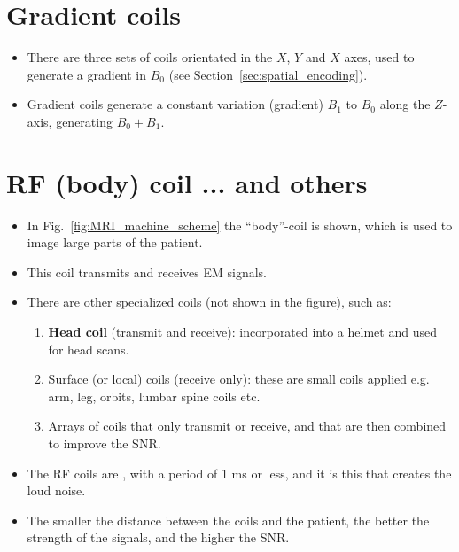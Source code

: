 \section{Gradient coils}
\begin{itemize}
\item There are three sets of coils orientated in the $X$, $Y$ and $X$
  axes, used to generate a gradient in $B_0$ (see
  Section~\ref{sec:spatial_encoding}).
\item Gradient coils generate a constant variation (gradient) $B_1$ to
  $B_0$ along the $Z$-axis, generating $B_0+B_1$.
\end{itemize}

\section{\gls{RF} (body) coil ... and others}
\begin{itemize}
\item In Fig.~\ref{fig:MRI_machine_scheme} the ``body''-coil is shown,
  which is used to image large parts of the patient.
\item This coil transmits and receives \gls{EM} signals.
\item There are other specialized coils (not shown in the figure),
  such as:
  \begin{enumerate}
  \item \textbf{Head coil} (transmit and receive): incorporated into a
    helmet and used for head scans.
  \item Surface (or local) coils (receive only): these are small coils
    applied  e.g. arm, leg, orbits, lumbar spine coils
    etc.
  \item Arrays of coils that only transmit or receive, and that are
    then combined to improve the SNR.
  \end{enumerate}
\item The RF coils are , with a period of 1 ms
  or less, and it is this that creates the loud noise.
\item The smaller the distance between the coils and the patient, the
  better the strength of the signals, and the higher the \gls{SNR}.
\end{itemize}

